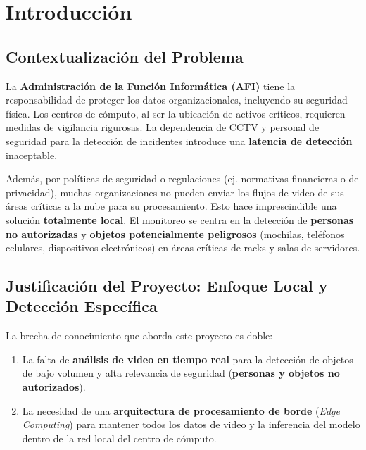 \documentclass[12pt, a4paper]{article}
\begin{document}
\newpage

\tableofcontents
\listoffigures
\listoftables

\newpage

\section{Introducción}

\subsection{Contextualización del Problema}

La \textbf{Administración de la Función Informática (AFI)} tiene la responsabilidad de proteger los datos organizacionales, incluyendo su seguridad física. Los centros de cómputo, al ser la ubicación de activos críticos, requieren medidas de vigilancia rigurosas. La dependencia de CCTV y personal de seguridad para la detección de incidentes introduce una \textbf{latencia de detección} inaceptable.

Además, por políticas de seguridad o regulaciones (ej. normativas financieras o de privacidad), muchas organizaciones no pueden enviar los flujos de video de sus áreas críticas a la nube para su procesamiento. Esto hace imprescindible una solución \textbf{totalmente local}. El monitoreo se centra en la detección de \textbf{personas no autorizadas} y \textbf{objetos potencialmente peligrosos} (mochilas, teléfonos celulares, dispositivos electrónicos) en áreas críticas de racks y salas de servidores.

\subsection{Justificación del Proyecto: Enfoque Local y Detección Específica}

La brecha de conocimiento que aborda este proyecto es doble:
\begin{enumerate}
\item La falta de \textbf{análisis de video en tiempo real} para la detección de objetos de bajo volumen y alta relevancia de seguridad (\textbf{personas y objetos no autorizados}).
\item La necesidad de una \textbf{arquitectura de procesamiento de borde} (\textit{Edge Computing}) para mantener todos los datos de video y la inferencia del modelo dentro de la red local del centro de cómputo.
\end{enumerate}
\end{document}
